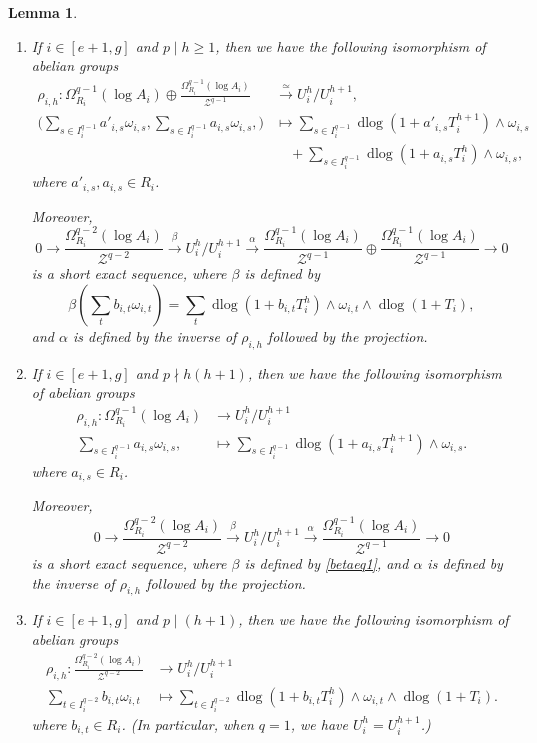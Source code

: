 \documentclass[11pt]{amsart}
\newcommand{\eq}[2]{\begin{equation}\label{#1}#2 \end{equation}}
\newcommand{\ra}{\rightarrow}
\newcommand{\cZ}{\mathcal{Z}}
\newcommand{\xra}{\xrightarrow}
\newcommand{\dlog}{\operatorname{dlog}}
\theoremstyle{plain}
\newtheorem{lem}[prop]{Lemma}
\theoremstyle{definition}
\numberwithin{equation}{prop}
\begin{document}
\begin{lem}
\begin{enumerate}
\item \label{lem3(4}
If  $i\in [e+1,g]$ and $p\mid h\ge 1$, then we have the following isomorphism of abelian groups
\begin{align*}
\rho_{i,h}:
\Omega^{q-1}_{R_i}(\log A_i)
\oplus
\frac{\Omega^{q-1}_{R_i}(\log A_i)}{\cZ^{q-1}}
&\xra{\simeq}
U_i^{h}/U_i^{h+1},
\\
\Big(
\sum_{s\in I_i^{q-1}} a'_{i,s}\omega_{i,s},
\sum_{s\in I_i^{q-1}} a_{i,s}\omega_{i,s},
\Big)
&\mapsto
\sum_{s\in I_i^{q-1}} \dlog(1+a'_{i,s}T_i^{h+1})\wedge\omega_{i,s}
\nonumber
\\
&\quad +
\sum_{s\in I_i^{q-1}} \dlog(1+a_{i,s}T_i^{h})\wedge\omega_{i,s},
\end{align*}
where $a'_{i,s}, a_{i,s}\in R_i$.


Moreover, 
$$0\ra \frac{\Omega^{q-2}_{R_i}(\log A_i)}{\cZ^{q-2}}
\xra{\beta} U_i^{h}/U_i^{h+1}
\xra{\alpha}
\frac{\Omega^{q-1}_{R_i}(\log A_i)}{\cZ^{q-1}}\oplus \frac{\Omega^{q-1}_{R_i}(\log A_i)}{\cZ^{q-1}}
\ra 0 $$
is a short exact sequence, where $\beta$ is defined by 
\eq{betaeq1}{
\beta(\sum_t b_{i,t}\omega_{i,t})=\sum_{t} \dlog(1+b_{i,t}T_i^{h})\wedge\omega_{i,t}\wedge\dlog (1+T_i),
}
and $\alpha$ is defined by the inverse of $\rho_{i,h}$ followed by the projection.


\item\label{lem3(5}
If $i\in [e+1,g]$ and $p\nmid h(h+1)$,
then we have the following isomorphism of abelian groups
\begin{align*}
\rho_{i,h}:
\Omega^{q-1}_{R_i}(\log A_i)
&\ra
U_i^{h}/U_i^{h+1}
\\
\sum_{s\in I_i^{q-1}} a_{i,s}\omega_{i,s},
&\mapsto
\sum_{s\in I_i^{q-1}} \dlog(1+a_{i,s}T_i^{h+1})\wedge\omega_{i,s}.
\end{align*}
where $a_{i,s}\in R_i$. 

Moreover, 
$$0\ra 
\frac{\Omega^{q-2}_{R_i}(\log A_i)}{\cZ^{q-2}}
\xra{\beta} U_i^{h}/U_i^{h+1}
\xra{\alpha} \frac{\Omega^{q-1}_{R_i}(\log A_i)}{\cZ^{q-1}}
\ra 0 $$
is a short exact sequence, where $\beta$ is defined by \eqref{betaeq1},
and $\alpha$ is defined by the inverse of $\rho_{i,h}$ followed by the projection.

\item\label{lem3(6}
If $i\in [e+1,g]$ and $p\mid (h+1)$, then we have the following isomorphism of abelian groups
\begin{align*}
\rho_{i,h}:
\frac{\Omega^{q-2}_{R_i}(\log A_i)}
{\cZ^{q-2}}
&\ra
U_i^{h}/U_i^{h+1}
\\
\sum_{t\in I_i^{q-2}} b_{i,t}\omega_{i,t}
&\mapsto
\sum_{t\in I_i^{q-2}} 
\dlog(1+b_{i,t}T_i^{h})\wedge\omega_{i,t}
\wedge \dlog (1+T_i).
\end{align*}
where $b_{i,t}\in R_i$.
(In particular, when $q=1$, we have $U_i^{h}=U_i^{h+1}$.)




\end{enumerate}
\end{lem}
\end{document}
